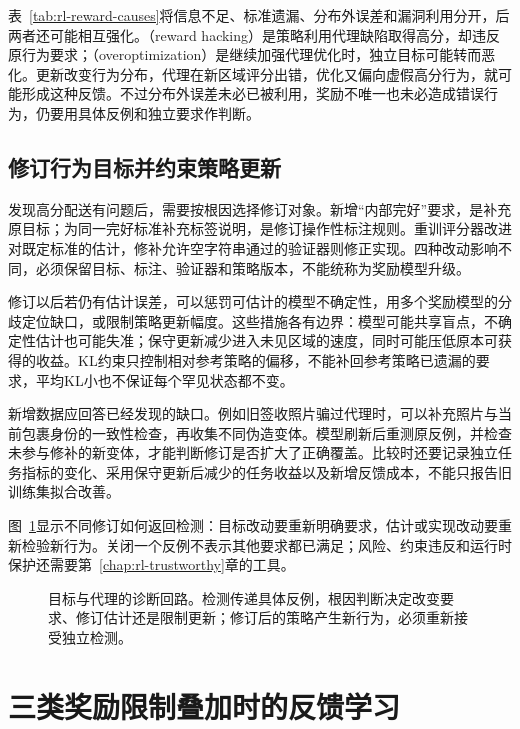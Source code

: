 表~\ref{tab:rl-reward-causes}将信息不足、标准遗漏、分布外误差和漏洞利用分开，后两者还可能相互强化。（reward hacking）是策略利用代理缺陷取得高分，却违反原行为要求；（overoptimization）是继续加强代理优化时，独立目标可能转而恶化。更新改变行为分布，代理在新区域评分出错，优化又偏向虚假高分行为，就可能形成这种反馈。不过分布外误差未必已被利用，奖励不唯一也未必造成错误行为，仍要用具体反例和独立要求作判断。

\subsection{修订行为目标并约束策略更新}
\label{sec:rl-reward-revision}

发现高分配送有问题后，需要按根因选择修订对象。新增“内部完好”要求，是补充原目标；为同一完好标准补充标签说明，是修订操作性标注规则。重训评分器改进对既定标准的估计，修补允许空字符串通过的验证器则修正实现。四种改动影响不同，必须保留目标、标注、验证器和策略版本，不能统称为奖励模型升级。

修订以后若仍有估计误差，可以惩罚可估计的模型不确定性，用多个奖励模型的分歧定位缺口，或限制策略更新幅度。这些措施各有边界：模型可能共享盲点，不确定性估计也可能失准；保守更新减少进入未见区域的速度，同时可能压低原本可获得的收益。KL约束只控制相对参考策略的偏移，不能补回参考策略已遗漏的要求，平均KL小也不保证每个罕见状态都不变。

新增数据应回答已经发现的缺口。例如旧签收照片骗过代理时，可以补充照片与当前包裹身份的一致性检查，再收集不同伪造变体。模型刷新后重测原反例，并检查未参与修补的新变体，才能判断修订是否扩大了正确覆盖。比较时还要记录独立任务指标的变化、采用保守更新后减少的任务收益以及新增反馈成本，不能只报告旧训练集拟合改善。

图~\ref{fig:rl-reward-revision}显示不同修订如何返回检测：目标改动要重新明确要求，估计或实现改动要重新检验新行为。关闭一个反例不表示其他要求都已满足；风险、约束违反和运行时保护还需要第~\ref{chap:rl-trustworthy}章的工具。

\begin{figure}[htbp]
  \centering
  
  \caption{目标与代理的诊断回路。检测传递具体反例，根因判断决定改变要求、修订估计还是限制更新；修订后的策略产生新行为，必须重新接受独立检测。}
  \label{fig:rl-reward-revision}
\end{figure}

\section{三类奖励限制叠加时的反馈学习}
\label{sec:rl-reward-loop}

